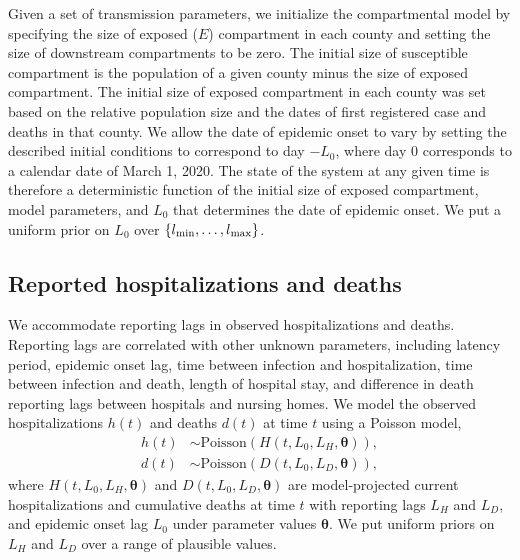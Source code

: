 \documentclass[11pt]{article}
\newcommand{\btheta}{\boldsymbol{\theta}}
\begin{document}
Given a set of transmission parameters, we initialize the compartmental model by specifying the size of exposed ($E$) compartment in each county and setting the size of downstream compartments to be zero. The initial size of susceptible compartment is the population of a given county minus the size of exposed compartment. The initial size of exposed compartment in each county was set based on the relative population size and the dates of first registered case and deaths in that county. 
We allow the date of epidemic onset to vary by setting the described initial conditions to correspond to day $-L_0$, where day $0$ corresponds to a calendar date of March 1, 2020. 
The state of the system at any given time is therefore a deterministic function of the initial size of exposed compartment, model parameters, and $L_0$ that determines the date of epidemic onset. We put a uniform prior on $L_{0}$ over $\{l\textsubscript{min}, \ldots, l\textsubscript{max}\}$.



\subsection{Reported hospitalizations and deaths} 

We accommodate reporting lags in observed hospitalizations and deaths. Reporting lags are correlated with other unknown parameters, including latency period, epidemic onset lag, time between infection and hospitalization, time between infection and death, length of hospital stay, and difference in death reporting lags between hospitals and nursing homes. We model the observed hospitalizations $h(t)$ and deaths $d(t)$ at time $t$ using a Poisson model,  
\begin{align}
h(t) &\sim \mbox{Poisson}(H(t, L_0, L_H, \btheta)), \\
d(t) &\sim \mbox{Poisson}(D(t, L_0, L_D, \btheta)), 
\end{align}
where $H(t, L_0, L_H, \btheta)$ and $D(t, L_0, L_D, \btheta)$ are model-projected current hospitalizations and cumulative deaths at time $t$ with reporting lags $L_H$ and $L_D$, and epidemic onset lag $L_0$ under parameter values $\btheta$. We put uniform priors on $L_H$ and $L_D$ over a range of plausible values. 
\end{document}
